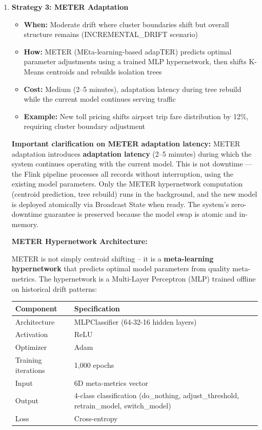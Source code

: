 \begin{enumerate}
    \item \textbf{Strategy 3: METER Adaptation}
            \begin{itemize}
            \item \textbf{When:} Moderate drift where cluster boundaries shift but overall structure remains (INCREMENTAL\_DRIFT scenario)
            \item \textbf{How:} METER (MEta-learning-based adapTER) predicts optimal parameter adjustments using a trained MLP hypernetwork, then shifts K-Means centroids and rebuilds isolation trees
            \item \textbf{Cost:} Medium (2--5 minutes), adaptation latency during tree rebuild while the current model continues serving traffic
            \item \textbf{Example:} New toll pricing shifts airport trip fare distribution by 12\%, requiring cluster boundary adjustment
        \end{itemize}

        \textbf{Important clarification on METER adaptation latency:} METER adaptation introduces \textbf{adaptation latency} (2--5 minutes) during which the system continues operating with the current model. This is not downtime --- the Flink pipeline processes all records without interruption, using the existing model parameters. Only the METER hypernetwork computation (centroid prediction, tree rebuild) runs in the background, and the new model is deployed atomically via Broadcast State when ready. The system's zero-downtime guarantee is preserved because the model swap is atomic and in-memory.

        \textbf{METER Hypernetwork Architecture:}

        METER is not simply centroid shifting -- it is a \textbf{meta-learning hypernetwork} that predicts optimal model parameters from quality meta-metrics. The hypernetwork is a Multi-Layer Perceptron (MLP) trained offline on historical drift patterns:

        \begin{center}
        \begin{tabular}{|l|l|}
        \hline
        \textbf{Component} & \textbf{Specification} \\
        \hline
        Architecture & MLPClassifier (64-32-16 hidden layers) \\
        Activation & ReLU \\
        Optimizer & Adam \\
        Training iterations & 1,000 epochs \\
        Input & 6D meta-metrics vector \\
        Output & 4-class classification (do\_nothing, adjust\_threshold, retrain\_model, switch\_model) \\
        Loss & Cross-entropy \\
        \hline
        \end{tabular}
        \end{center}


\end{enumerate}
